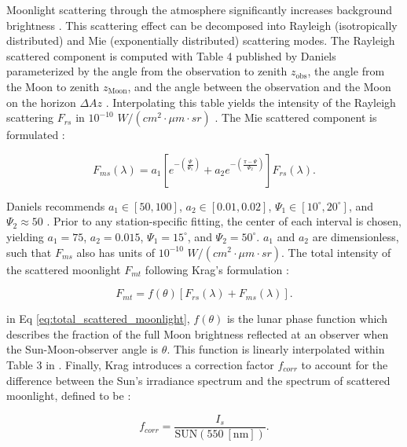 Moonlight scattering through the atmosphere significantly increases background brightness \cite{krag2003}. This scattering effect can be decomposed into Rayleigh (isotropically distributed) and Mie (exponentially distributed) scattering modes. The Rayleigh scattered component is computed with Table 4 published by Daniels parameterized by the angle from the observation to zenith $z_\mathrm{obs}$, the angle from the Moon to zenith $z_\mathrm{Moon}$, and the angle between the observation and the Moon on the horizon $\Delta Az$ \cite{daniels1977}. Interpolating this table yields the intensity of the Rayleigh scattering $F_{rs}$ in $10^{-10}$ $W/(cm^2 \cdot \mu m \cdot sr)$ \cite{krag2003}. The Mie scattered component is formulated \cite{krag2003}:

\begin{equation} \label{eq:mie_scattering_moon}
  F_{ms}(\lambda) = a_1 \left[ e^{-\left(\frac{\Psi}{\Psi_1}\right)} + a_2 e^{-\left(\frac{\pi - \Psi}{\Psi_2}\right)} \right] F_{rs}(\lambda).
\end{equation}

Daniels recommends $a_1 \in [50, 100]$, $a_2 \in [0.01, 0.02]$, $\Psi_1 \in [10^\circ, 20^\circ]$, and $\Psi_2 \approx 50$ \cite{daniels1977}. Prior to any station-specific fitting, the center of each interval is chosen, yielding $a_1 = 75$, $a_2 = 0.015$, $\Psi_1 = 15^\circ$, and $\Psi_2 = 50^\circ$. $a_1$ and $a_2$ are dimensionless, such that $F_{ms}$ also has units of $10^{-10}$ $W/(cm^2 \cdot \mu m \cdot sr)$. The total intensity of the scattered moonlight $F_{mt}$ following Krag's formulation \cite{krag2003}:

\begin{equation} \label{eq:total_scattered_moonlight}
  F_{mt} = f(\theta) \left[ F_{rs}(\lambda) + F_{ms}(\lambda) \right].
\end{equation}

in Eq \ref{eq:total_scattered_moonlight}, $f(\theta)$ is the lunar phase function which describes the fraction of the full Moon brightness reflected at an observer when the Sun-Moon-observer angle is $\theta$. This function is linearly interpolated within Table 3 in \cite{daniels1977}. Finally, Krag introduces a correction factor $f_{corr}$ to account for the difference between the Sun's irradiance spectrum and the spectrum of scattered moonlight, defined to be \cite{krag2003}:

\begin{equation} \label{eq:krag_f_corr}
  f_{corr} = \frac{I_s}{\textrm{SUN}(550 \: \left[\textrm{nm}\right])}.
\end{equation}

